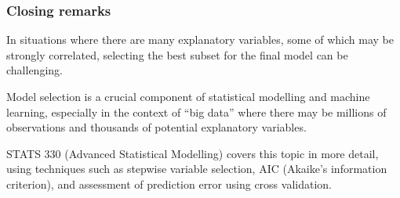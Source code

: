 \documentclass{beamer}\usepackage[]{graphicx}\usepackage[]{xcolor}
\begin{document}

\begin{frame}[fragile]
\frametitle{Closing remarks}

In situations where there are many explanatory variables,
some of which may be strongly correlated,
selecting the best subset for the final model can be challenging.
\bigskip

Model selection is a crucial component of statistical modelling and machine learning, especially in the context of ``big data'' where there may be millions of observations and thousands of potential explanatory variables.
\bigskip

STATS 330 (Advanced Statistical Modelling) covers this topic in more detail,
using techniques such as stepwise variable selection, AIC (Akaike's information criterion), and assessment of prediction error using cross validation.
\vfill
\end{frame}
\end{document}

